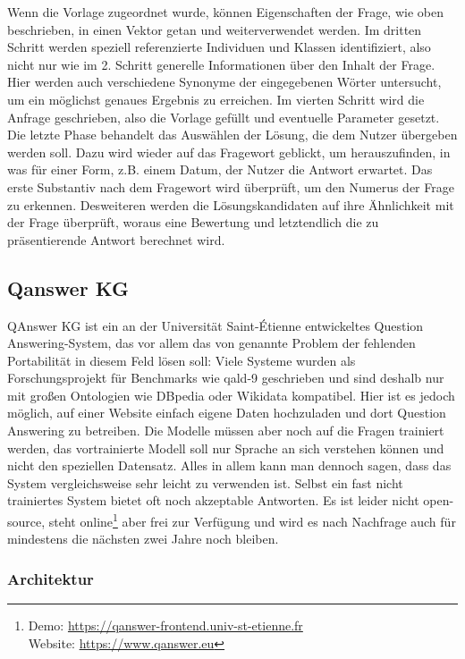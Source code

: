 Wenn die Vorlage zugeordnet wurde, können Eigenschaften der Frage, wie oben beschrieben, in einen Vektor getan und weiterverwendet werden.
Im dritten Schritt werden speziell referenzierte Individuen und Klassen identifiziert, also nicht nur wie im 2. Schritt generelle Informationen über den Inhalt der Frage.
Hier werden auch verschiedene Synonyme der eingegebenen Wörter untersucht, um ein möglichst genaues Ergebnis zu erreichen.
Im vierten Schritt wird die Anfrage geschrieben, also die Vorlage gefüllt und eventuelle Parameter gesetzt.
Die letzte Phase behandelt das Auswählen der Lösung, die dem Nutzer übergeben werden soll.
Dazu wird wieder auf das Fragewort geblickt, um herauszufinden, in was für einer Form, z.B. einem Datum, der Nutzer die Antwort erwartet.
Das erste Substantiv nach dem Fragewort wird überprüft, um den Numerus der Frage zu erkennen.
Desweiteren werden die Lösungskandidaten auf ihre Ähnlichkeit mit der Frage überprüft, woraus eine Bewertung und letztendlich die zu präsentierende Antwort berechnet wird.

\subsection{Qanswer KG}

QAnswer KG \citep{qanswer} ist ein an der Universität Saint-Étienne entwickeltes Question Answering-System,
das vor allem das von \citet{diefenbachkbqa} genannte Problem der fehlenden Portabilität in diesem Feld lösen soll:
Viele Systeme wurden als Forschungsprojekt für Benchmarks wie \ac{qald}-9 geschrieben und sind deshalb nur mit großen Ontologien wie DBpedia oder Wikidata kompatibel.
Hier ist es jedoch möglich, auf einer Website einfach eigene Daten hochzuladen und dort Question Answering zu betreiben.
Die Modelle müssen aber noch auf die Fragen trainiert werden, das vortrainierte Modell soll nur Sprache an sich verstehen können und nicht den speziellen Datensatz.
Alles in allem kann man dennoch sagen, dass das System vergleichsweise sehr leicht zu verwenden ist.
Selbst ein fast nicht trainiertes System bietet oft noch akzeptable Antworten.
Es ist leider nicht open-source, steht online\footnote{Demo: \url{https://qanswer-frontend.univ-st-etienne.fr}\\Website: \url{https://www.qanswer.eu}} aber frei zur Verfügung und wird es nach Nachfrage auch für mindestens die nächsten zwei Jahre noch bleiben.

\subsubsection{Architektur}

